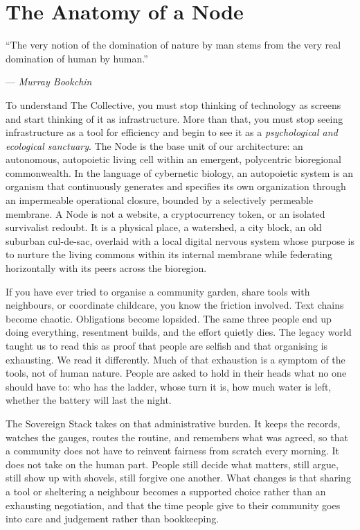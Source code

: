 \chapter{The Anatomy of a Node}

\epigraph{``The very notion of the domination of nature by man stems from the very real domination of human by human.''}{--- \textit{Murray Bookchin} \parencite{bookchin1982}}

To understand The Collective, you must stop thinking of technology as screens and start thinking of it as infrastructure. More than that, you must stop seeing infrastructure as a tool for efficiency and begin to see it as a \textit{psychological and ecological sanctuary}. The Node is the base unit of our architecture: an autonomous, autopoietic living cell \parencite{maturana1980} within an emergent, polycentric bioregional commonwealth. In the language of cybernetic biology, an autopoietic system is an organism that continuously generates and specifies its own organization through an impermeable operational closure, bounded by a selectively permeable membrane. A Node is not a website, a cryptocurrency token, or an isolated survivalist redoubt. It is a physical place, a watershed, a city block, an old suburban cul-de-sac, overlaid with a local digital nervous system whose purpose is to nurture the living commons within its internal membrane while federating horizontally with its peers across the bioregion.

If you have ever tried to organise a community garden, share tools with neighbours, or coordinate childcare, you know the friction involved. Text chains become chaotic. Obligations become lopsided. The same three people end up doing everything, resentment builds, and the effort quietly dies. The legacy world taught us to read this as proof that people are selfish and that organising is exhausting. We read it differently. Much of that exhaustion is a symptom of the tools, not of human nature. People are asked to hold in their heads what no one should have to: who has the ladder, whose turn it is, how much water is left, whether the battery will last the night.

The Sovereign Stack takes on that administrative burden. It keeps the records, watches the gauges, routes the routine, and remembers what was agreed, so that a community does not have to reinvent fairness from scratch every morning. It does not take on the human part. People still decide what matters, still argue, still show up with shovels, still forgive one another. What changes is that sharing a tool or sheltering a neighbour becomes a supported choice rather than an exhausting negotiation, and that the time people give to their community goes into care and judgement rather than bookkeeping.

